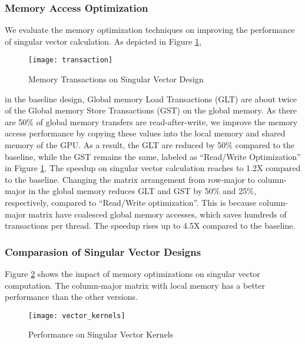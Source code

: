 \subsubsection{Memory Access Optimization}
We evaluate the memory optimization techniques on improving the performance
of singular vector calculation. As depicted in Figure \ref{fig:transaction},
\begin{figure}[hbpt]
\centering
\texttt{[image: transaction]}
\caption{Memory Transactions on Singular Vector Design}
\label{fig:transaction}
\vspace{-0.15in}
\end{figure}
in the baseline design,
Global memory Load Transactions (GLT) are about twice of the Global memory Store Transactions (GST) on the global memory.
As there are 50\% of global memory transfers are read-after-write, we improve the memory access performance by copying these values into the local memory and shared memory of the GPU. As a result, the GLT are reduced by 50\% compared to the baseline, while the GST remains the same, labeled as ``Read/Write Optimization'' in Figure \ref{fig:transaction}. The speedup on singular vector calculation reaches to 1.2X compared to the baseline.
Changing the matrix arrangement from row-major to column-major in the global memory 
reduces GLT and GST by 50\% and 25\%, respectively, compared to ``Read/Write optimization''. 
This is because column-major matrix have coalesced global memory accesses, which saves hundreds of transactions per thread. The speedup rises up to 4.5X compared to the baseline.

\subsubsection{Comparasion of Singular Vector Designs}
Figure \ref{fig:vector_kernels} shows the impact of memory optimizations on singular vector computation.
The column-major matrix with local memory has a better performance than the other versions.
\begin{figure}[hbpt]
\centering
\texttt{[image: vector\_kernels]}
\caption{Performance on Singular Vector Kernels}
\label{fig:vector_kernels}
\end{figure}
\fi


